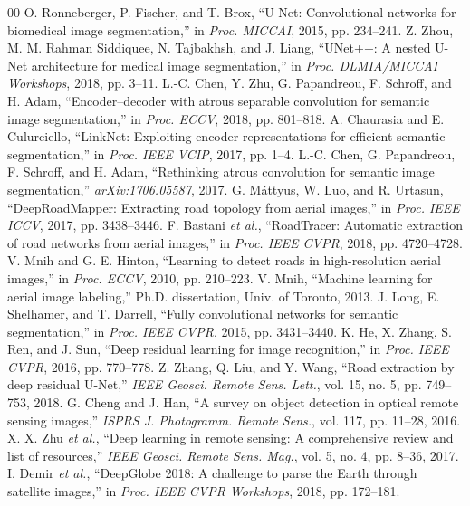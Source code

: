 \documentclass[conference]{IEEEtran}
\begin{document}
\begin{thebibliography}{00}
 O. Ronneberger, P. Fischer, and T. Brox,
``U-Net: Convolutional networks for biomedical image segmentation,'' in
\emph{Proc. MICCAI}, 2015, pp. 234--241.
 Z. Zhou, M. M. Rahman Siddiquee, N. Tajbakhsh, and
J. Liang, ``UNet++: A nested U-Net architecture for medical image
segmentation,'' in \emph{Proc. DLMIA/MICCAI Workshops}, 2018, pp. 3--11.
 L.-C. Chen, Y. Zhu, G. Papandreou, F. Schroff,
and H. Adam, ``Encoder--decoder with atrous separable convolution for semantic
image segmentation,'' in \emph{Proc. ECCV}, 2018, pp. 801--818.
 A. Chaurasia and E. Culurciello, ``LinkNet:
Exploiting encoder representations for efficient semantic segmentation,'' in
\emph{Proc. IEEE VCIP}, 2017, pp. 1--4.
 L.-C. Chen, G. Papandreou, F. Schroff, and
H. Adam, ``Rethinking atrous convolution for semantic image segmentation,''
\emph{arXiv:1706.05587}, 2017.
 G. M\'attyus, W. Luo, and R. Urtasun,
``DeepRoadMapper: Extracting road topology from aerial images,'' in
\emph{Proc. IEEE ICCV}, 2017, pp. 3438--3446.
 F. Bastani \emph{et al.}, ``RoadTracer:
Automatic extraction of road networks from aerial images,'' in \emph{Proc.
IEEE CVPR}, 2018, pp. 4720--4728.
 V. Mnih and G. E. Hinton, ``Learning to detect
roads in high-resolution aerial images,'' in \emph{Proc. ECCV}, 2010,
pp. 210--223.
 V. Mnih, ``Machine learning for aerial image
labeling,'' Ph.D. dissertation, Univ. of Toronto, 2013.
 J. Long, E. Shelhamer, and T. Darrell, ``Fully
convolutional networks for semantic segmentation,'' in \emph{Proc. IEEE CVPR},
2015, pp. 3431--3440.
 K. He, X. Zhang, S. Ren, and J. Sun, ``Deep residual
learning for image recognition,'' in \emph{Proc. IEEE CVPR}, 2016,
pp. 770--778.
 Z. Zhang, Q. Liu, and Y. Wang, ``Road extraction by
deep residual U-Net,'' \emph{IEEE Geosci. Remote Sens. Lett.}, vol. 15, no. 5,
pp. 749--753, 2018.
 G. Cheng and J. Han, ``A survey on object detection
in optical remote sensing images,'' \emph{ISPRS J. Photogramm. Remote Sens.},
vol. 117, pp. 11--28, 2016.
 X. X. Zhu \emph{et al.}, ``Deep learning in remote
sensing: A comprehensive review and list of resources,'' \emph{IEEE Geosci.
Remote Sens. Mag.}, vol. 5, no. 4, pp. 8--36, 2017.
 I. Demir \emph{et al.}, ``DeepGlobe 2018: A
challenge to parse the Earth through satellite images,'' in \emph{Proc. IEEE
CVPR Workshops}, 2018, pp. 172--181.
\end{thebibliography}
\end{document}
